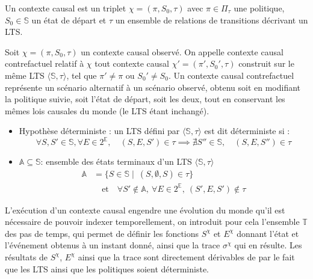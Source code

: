 \begin{definition}
    Un contexte causal est un triplet $\chi = (\pi, S_0,\tau)$ avec $\pi \in \Pi_\tau$ une politique, $S_0\in \mathds{S}$ un état de départ et $\tau$ un ensemble de relations de transitions décrivant un LTS.
\end{definition}

\begin{definition}
    Soit $\chi = (\pi, S_0, \tau)$ un contexte causal observé. On appelle contexte causal contrefactuel relatif à $\chi$ tout contexte causal $\chi' = (\pi', S_0', \tau)$ construit sur le même LTS $\langle \mathds{S},\tau\rangle$, tel que $\pi' \neq \pi$ ou $S_0' \neq S_0$. Un contexte causal contrefactuel représente un scénario alternatif à un scénario observé, obtenu soit en modifiant la politique suivie, soit l'état de départ, soit les deux, tout en conservant les mêmes lois causales du monde (le LTS étant inchangé).
\end{definition}

\begin{itemize}
    \item Hypothèse déterministe : un LTS défini par $\langle\mathds{S},\tau\rangle$ est dit déterministe si :  
        \begin{equation*}
            \forall S,S'\in \mathds{S}, \forall E\in 2^{\mathds{E}}, \quad (S,E,S')\in \tau \implies \nexists S'' \in \mathds{S}, \quad (S,E,S'')\in \tau
        \end{equation*}
    \item $\mathds{A} \subseteq \mathds{S}$: ensemble des états terminaux d'un LTS $\langle\mathds{S},\tau\rangle$
        \begin{equation*}
        \begin{aligned}
            \mathds{A} &= \{ S\in \mathds{S} \mid\ (S,\emptyset,S) \in \tau \} \\
                    &\quad \text{et} \quad \forall S' \notin \mathds{A},\ \forall E \in 2^{\mathds{E}},\ (S',E,S')\notin \tau
        \end{aligned}
        \end{equation*}
    \end{itemize}

L'exécution d'un contexte causal engendre une évolution du monde qu'il est nécessaire de pouvoir indexer temporellement, on introduit pour cela l'ensemble $\mathds{T}$ des pas de temps, qui permet de définir les fonctions $S^\chi$ et $E^\chi$ donnant l'état et l'événement obtenus à un instant donné, ainsi que la trace $\sigma^\chi$ qui en résulte. Les résultats de $S^\chi$, $E^\chi$ ainsi que la trace sont directement dérivables de par le fait que les LTS ainsi que les politiques soient déterministe. 

